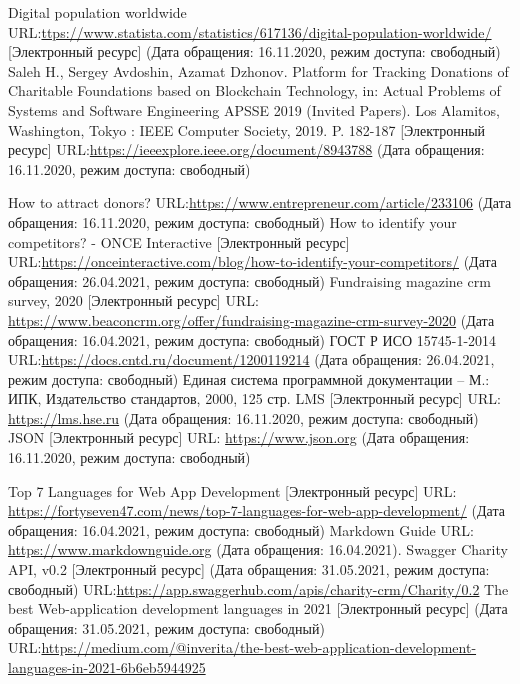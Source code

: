 \documentclass[a4paper,12pt,reqno]{article}
\begin{document}
\newpage
	\begin{thebibliography}{27}
	     Digital population worldwide URL:\url{ttps://www.statista.com/statistics/617136/digital-population-worldwide/} [Электронный ресурс] (Дата обращения: 16.11.2020, режим доступа: свободный)
	     Saleh H., Sergey Avdoshin, Azamat Dzhonov. Platform for Tracking Donations of Charitable Foundations based on Blockchain Technology, in: Actual Problems of Systems and Software Engineering APSSE 2019 (Invited Papers). Los Alamitos, Washington, Tokyo : IEEE Computer Society, 2019. P. 182-187 [Электронный ресурс] URL:\url{https://ieeexplore.ieee.org/document/8943788} (Дата обращения: 16.11.2020, режим доступа: свободный)

	    
	     How to attract donors? URL:\url{https://www.entrepreneur.com/article/233106} (Дата обращения: 16.11.2020, режим доступа: свободный)
	     How to identify your competitors? - ONCE Interactive [Электронный ресурс] URL:\url{https://onceinteractive.com/blog/how-to-identify-your-competitors/} (Дата обращения: 26.04.2021, режим доступа: свободный)
		Fundraising magazine crm survey, 2020 [Электронный ресурс] URL: 
		\url{https://www.beaconcrm.org/offer/fundraising-magazine-crm-survey-2020} (Дата обращения: 16.04.2021, режим доступа: свободный)
		 ГОСТ Р ИСО 15745-1-2014 URL:\url{https://docs.cntd.ru/document/1200119214} (Дата обращения: 26.04.2021, режим доступа: свободный)
		Единая система программной документации – М.: ИПК, Издательство стандартов, 2000, 125 стр.
		LMS [Электронный ресурс] URL: 
		\url{https://lms.hse.ru} (Дата обращения: 16.11.2020, режим доступа: свободный)
		 JSON [Электронный ресурс] URL: \url{https://www.json.org} (Дата обращения: 16.11.2020, режим доступа: свободный)
		
		 Top 7 Languages for Web App Development [Электронный ресурс] URL: \url{https://fortyseven47.com/news/top-7-languages-for-web-app-development/} (Дата обращения: 16.04.2021, режим доступа: свободный)
		 Markdown Guide URL: \url{https://www.markdownguide.org} (Дата обращения: 16.04.2021).
		 Swagger Charity API, v0.2 [Электронный ресурс] (Дата обращения: 31.05.2021, режим доступа: свободный) URL:\url{https://app.swaggerhub.com/apis/charity-crm/Charity/0.2}
		 The best Web-application development languages in 2021 [Электронный ресурс] (Дата обращения: 31.05.2021, режим доступа: свободный) URL:\url{https://medium.com/@inverita/the-best-web-application-development-languages-in-2021-6b6eb5944925}
		

\end{thebibliography}
\end{document}
